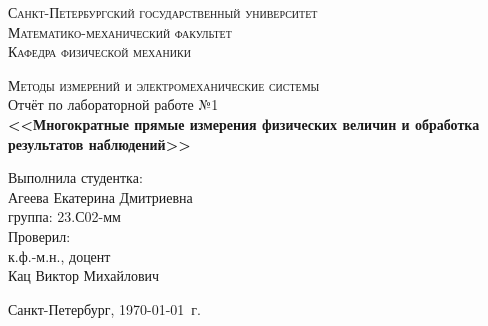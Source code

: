 \begin{titlepage}
\begin{center}
\textsc{Санкт-Петербургский государственный университет\\
Математико-механический факультет\\
Кафедра физической механики\\}

\vfill

\textsc{Методы измерений и электромеханические системы\\[3mm]}
Отчёт по лабораторной работе №1\\[6mm]


\textbf{\large<<Многократные прямые измерения физических величин и обработка результатов наблюдений>>}

\vfill
\end{center}

\hfill
\begin{minipage}{.5\textwidth}
Выполнила студентка:\\[2mm] 
Агеева Екатерина Дмитриевна\\
группа: 23.С02-мм\\[5mm]

Проверил:\\[2mm] 
к.ф.-м.н., доцент\\
Кац Виктор Михайлович
\end{minipage}%
\vfill
\begin{center}
 Санкт-Петербург, \yeardate\today\ г.
\end{center}
\end{titlepage}